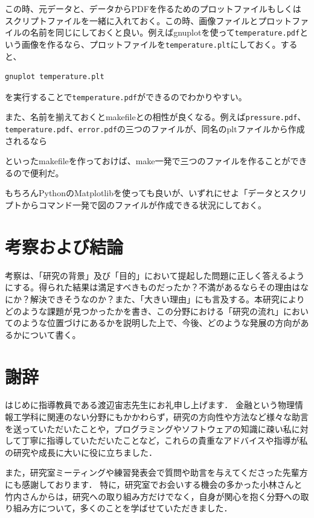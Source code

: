 \documentclass[titlepage]{jsreport}
\begin{document}
この時、元データと、データからPDFを作るためのプロットファイルもしくはスクリプトファイルを一緒に入れておく。この時、画像ファイルとプロットファイルの名前を同じにしておくと良い。例えばgnuplotを使って\verb|temperature.pdf|という画像を作るなら、プロットファイルを\verb|temperature.plt|にしておく。すると、

\begin{lstlisting}[language=bash]
gnuplot temperature.plt
\end{lstlisting}

を実行することで\verb|temperature.pdf|ができるのでわかりやすい。

また、名前を揃えておくとmakefileとの相性が良くなる。例えば\verb|pressure.pdf|、\verb|temperature.pdf|、\verb|error.pdf|の三つのファイルが、同名のpltファイルから作成されるなら



といったmakefileを作っておけば、make一発で三つのファイルを作ることができるので便利だ。

もちろんPythonのMatplotlibを使っても良いが、いずれにせよ「データとスクリプトからコマンド一発で図のファイルが作成できる状況にしておく。

\chapter{考察および結論} \label{chap:summary}

考察は、「研究の背景」及び「目的」において提起した問題に正しく答えるようにする。得られた結果は満足すべきものだったか？不満があるならその理由はなにか？解決できそうなのか？また、「大きい理由」にも言及する。本研究によりどのような課題が見つかったかを書き、この分野における「研究の流れ」においてのような位置づけにあるかを説明した上で、今後、どのような発展の方向があるかについて書く。

\chapter*{謝辞}
はじめに指導教員である渡辺宙志先生にお礼申し上げます．
金融という物理情報工学科に関連のない分野にもかかわらず，研究の方向性や方法など様々な助言を送っていただいたことや，プログラミングやソフトウェアの知識に疎い私に対して丁寧に指導していただいたことなど，これらの貴重なアドバイスや指導が私の研究や成長に大いに役に立ちました．


また，研究室ミーティングや練習発表会で質問や助言を与えてくださった先輩方にも感謝しております．
特に，研究室でお会いする機会の多かった小林さんと竹内さんからは，研究への取り組み方だけでなく，自身が関心を抱く分野への取り組み方について，多くのことを学ばせていただきました．
\end{document}
